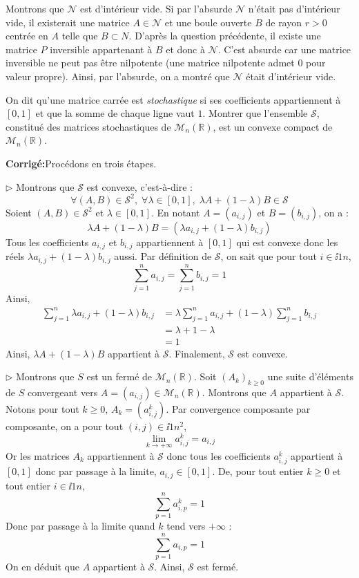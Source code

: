 \documentclass[a4paper,twoside,french,11pt]{VcCours}
\newcommand{\corr}{\textbf{Corrigé:}}
\begin{document}
\begin{enumerate}
\begin{enumerate}
Montrons que $\mathcal{N}$ est d'intérieur vide. Si par l'absurde $\mathcal{N}$ n'était pas d'intérieur vide, il existerait une matrice $A \in \mathcal{N}$ et une boule ouverte $B$ de rayon $r>0$ centrée en $A$ telle que $B \subset N$. D'après la question précédente, il existe une matrice $P$ inversible appartenant à $B$ et donc à $\mathcal{N}$. C'est absurde car une matrice inversible ne peut pas être nilpotente (une matrice nilpotente admet $0$ pour valeur propre). Ainsi, par l'absurde, on a montré que $\mathcal{N}$ était d'intérieur vide.
\end{enumerate}
\end{enumerate}


\begin{Exercice}{} On dit qu'une matrice carrée est \textit{stochastique} si ses coefficients appartiennent à $[0,1]$ et que la somme de chaque ligne vaut $1$. Montrer que l'ensemble $\mathcal{S}$, constitué des matrices stochastiques de $\mathcal{M}_n(\mathbb{R})$, est un convexe compact de $\mathcal{M}_n(\mathbb{R})$.
\end{Exercice} 

\corr Procédons en trois étapes.


$\rhd$ Montrons que $\mathcal{S}$ est convexe, c'est-à-dire :
$$ \forall (A,B) \in \mathcal{S}^2, \; \forall \lambda \in [0,1], \; \lambda A+(1-\lambda)B \in \mathcal{S}$$
Soient $(A,B) \in \mathcal{S}^2$ et $\lambda \in [0,1]$. En notant $A=(a_{i,j})$ et $B=(b_{i,j})$, on a :
$$ \lambda A+ (1- \lambda) B = (\lambda a_{i,j} + (1- \lambda) b_{i,j})$$
Tous les coefficients $a_{i,j}$ et $ b_{i,j}$ appartiennent à $[0,1]$ qui est convexe donc les réels $\lambda a_{i,j} + (1- \lambda) b_{i,j}$ aussi. Par définition de $\mathcal{S}$, on sait que pour tout $i \in \ii{1}{n}$,
$$ \sum_{j=1}^n a_{i,j} = \sum_{j=1}^n b_{i,j} = 1$$
Ainsi,
\begin{align*}
\sum_{j=1}^n \lambda a_{i,j} + (1 - \lambda) b_{i,j} & = \lambda   \sum_{j=1}^n a_{i,j} + (1 - \lambda)  \sum_{j=1}^n b_{i,j}  \\
& = \lambda + 1- \lambda \\
& = 1
\end{align*}
Ainsi, $\lambda A+ (1- \lambda)B$ appartient à $\mathcal{S}$. Finalement, $\mathcal{S}$ est convexe.


$\rhd$ Montrons que $S$ est un fermé de $\mathcal{M}_n(\mathbb{R})$. Soit $(A_k)_{k \geq 0}$ une suite d'éléments de $S$ convergeant vers $A=(a_{i,j}) \in \mathcal{M}_n(\mathbb{R})$. Montrons que $A$ appartient à $\mathcal{S}$. Notons pour tout $k \geq 0$, $A_k = (a_{i,j}^k)$. Par convergence composante par composante, on a pour tout $(i,j) \in \ii{1}{n}^2$,
$$ \lim_{k \rightarrow + \infty} a_{i,j}^k = a_{i,j}$$
Or les matrices $A_k$ appartiennent à $\mathcal{S}$ donc tous les coefficients $a_{i,j}^k$ appartient à $[0,1]$ donc par passage à la limite, $a_{i,j} \in [0,1]$. De, pour tout entier $k \geq 0$ et tout entier $i \in \ii{1}{n}$,
$$ \sum_{p=1}^n a_{i,p}^k = 1$$
Donc par passage à la limite quand $k$ tend vers $+ \infty$ :
$$ \sum_{p=1}^n a_{i,p} = 1$$
On en déduit que $A$ appartient à $\mathcal{S}$. Ainsi, $\mathcal{S}$ est fermé.
\end{document}
